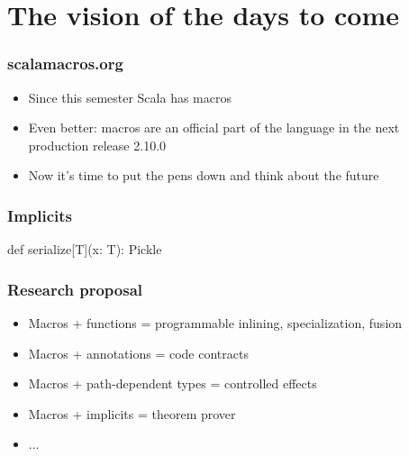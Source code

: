 \documentclass[hyperref={bookmarks=false}]{beamer}
\begin{document}
\section{The vision of the days to come}

\begin{frame}[fragile]
\frametitle{scalamacros.org}
\begin{itemize}
\item Since this semester Scala has macros
\item Even better: macros are an official part of the language in the next production release 2.10.0
\item Now it's time to put the pens down and think about the future
\end{itemize}
\end{frame}

\begin{frame}[fragile]
\frametitle{Implicits}
\begin{semiverbatim}
def serialize[T](x: T): Pickle

\end{semiverbatim}
\end{frame}

\begin{frame}[fragile]
\frametitle{Research proposal}
\begin{itemize}
\item Macros + functions = programmable inlining, specialization, fusion
\item Macros + annotations = code contracts
\item Macros + path-dependent types = controlled effects
\item Macros + implicits = theorem prover
\item ...
\end{itemize}
\end{frame}
\end{document}
